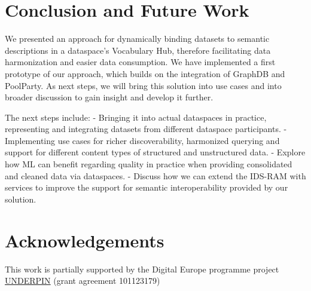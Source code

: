\documentclass[manuscript,screen]{acmart}
\begin{document}
\section{Conclusion and Future Work}\label{conclusion-and-future-work}

We presented an approach for dynamically binding datasets to semantic
descriptions in a dataspace's Vocabulary Hub, therefore facilitating
data harmonization and easier data consumption. We have implemented a
first prototype of our approach, which builds on the integration of
GraphDB and PoolParty. As next steps, we will bring this solution into
use cases and into broader discussion to gain insight and develop it
further.

The next steps include: - Bringing it into actual dataspaces in
practice, representing and integrating datasets from different dataspace
participants. - Implementing use cases for richer discoverability,
harmonized querying and support for different content types of
structured and unstructured data. - Explore how ML can benefit regarding
quality in practice when providing consolidated and cleaned data via
dataspaces. - Discuss how we can extend the IDS-RAM with services to
improve the support for semantic interoperability provided by our
solution.

\section{Acknowledgements}\label{acknowledgements}

This work is partially supported by the Digital Europe programme project
\href{https://underpinproject.eu/}{UNDERPIN} (grant agreement 101123179)




\end{document}
